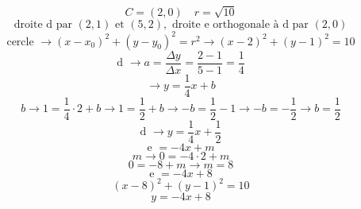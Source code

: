 \documentclass{article}
\begin{document}
\[ C=(2,0) \quad r=\sqrt{10} \]
\[ \text{droite d par } (2,1) \text{ et } (5,2), \text{ droite e orthogonale à d par } (2,0) \]
\[ \text{cercle } \to (x-x_0)^2 + (y-y_0)^2 = r^2 \to (x-2)^2 + (y-1)^2 = 10 \]
\[ \text{d } \to a = \frac{\Delta y}{\Delta x} = \frac{2-1}{5-1} = \frac{1}{4} \]
\[ \to y = \frac{1}{4}x + b \]
\[ b \to 1 = \frac{1}{4} \cdot 2 + b \to 1 = \frac{1}{2} + b \to -b = \frac{1}{2} - 1 \to -b = -\frac{1}{2} \to b = \frac{1}{2} \]
\[ \text{d } \to y = \frac{1}{4}x + \frac{1}{2} \]
\[ \text{e } = -4x + m \]
\[ m \to 0 = -4 \cdot 2 + m \]
\[ 0 = -8 + m \to m = 8 \]
\[ \text{e } = -4x + 8 \]
\[ (x-8)^2 + (y-1)^2 = 10 \]
\[ y = -4x + 8 \]
\end{document}
